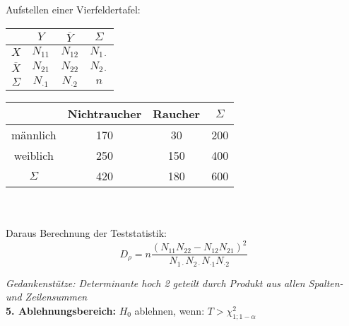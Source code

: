 Aufstellen einer Vierfeldertafel:\\

\begin{minipage}[c]{.4\textwidth}
    \centering
    \begin{tabular}{c|c|c|c}
                   & $Y$           & $\overline{Y}$ & $\Sigma$         \\ 
                   \hline
    $X$            & \(N_{11}\)    & \(N_{12}\)     & \(N_{1 \cdot} \) \\ 
    \hline
    $\overline{X}$ & \(N_{21}\)    & \(N_{22}\)     & \(N_{2\cdot} \)  \\ 
    \hline
    $\Sigma$       & $N_{\cdot 1}$ & $N_{\cdot 2}$  & $n$
    \end{tabular}
\end{minipage}
\begin{minipage}[c]{.6\textwidth}
    \centering
    \begin{tabular}{c|c|c|c}
             & Nichtraucher & Raucher & $\Sigma$ \\ 
    \hline
    männlich & 170          & 30      & 200 \\
    \hline
    weiblich & 250          & 150     & 400  \\
    \hline
    $\Sigma$ & 420          & 180     & 600
    \end{tabular}
\end{minipage}\\\\

Daraus Berechnung der Teststatistik:
\begin{equation*}
    D_{\rho} = n \frac{(N_{11}N_{22}-N_{12}N_{21})^2}{N_{1\cdot}N_{2\cdot}N_{\cdot1}N_{\cdot2}}
\end{equation*}

\emph{Gedankenstütze: Determinante hoch 2 geteilt durch Produkt aus allen Spalten- und Zeilensummen}\\

\textbf{5. Ablehnungsbereich:} \(H_0\) ablehnen, wenn:  \(T > \chi^2_{1;1-\alpha}\)\\